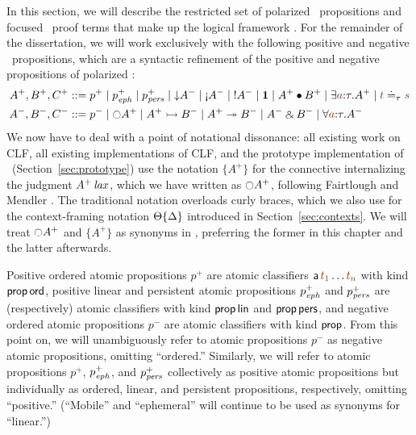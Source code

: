 In this section, we will describe the restricted set of polarized
\ollll~propositions and focused \ollll~proof terms that make up the
logical framework \sls. For the remainder of the dissertation, we will work
exclusively with the following positive and negative
\sls~propositions, which are a syntactic refinement of the positive
and negative propositions of polarized \ollll:
\begin{align*}
A^+, B^+, C^+ & ::= p^+ \mid p^+_\meph \mid p^+_\mpers \mid {\downarrow}A^-
  \mid {\gnab}A^- \mid {!}A^- \mid \one \mid A^+ \fuse B^+
  \mid \exists \lf{a}{:}\tau.A^+ \mid \lf{t} \doteq_\tau \lf{s}
\\
A^-, B^-, C^- & ::= p^- \mid {\ocircle}A^+ \mid A^+ \lefti B^- 
  \mid A^+ \righti B^- \mid A^- \with B^-
  \mid \forall \lf{a}{:}\tau.A^-
\end{align*}
We now have to deal with a point of notational dissonance: all
existing work on CLF, all existing implementations of CLF, and the
prototype implementation of \sls~(Section~\ref{sec:prototype}) use the
notation $\{ A^+ \}$ for the connective internalizing the judgment
${A^+}\,{{\it lax}}$, which we have written as ${\ocircle}A^+$, following
Fairtlough and Mendler \cite{fairtlough97propositional}. The
traditional notation overloads curly braces, which we also use for
the context-framing notation 
${\Theta}\{{\Delta}\}$ introduced in Section~\ref{sec:contexts}. We
will treat ${\ocircle}A^+$ and $\{ A^+ \}$ as synonyms in \sls, preferring the
former in this chapter and the latter afterwards.

Positive ordered atomic propositions $p^+$ are atomic classifiers
${\sf a}\,\lf{t_1}\ldots\lf{t_n}$ with kind ${\sf prop}\,{\sf ord}$,
positive linear and persistent atomic propositions $p^+_{\it eph}$ and
$p^+_{\it pers}$ are (respectively) atomic classifiers with kind ${\sf
  prop}\,{\sf lin}$ and ${\sf prop}\,{\sf pers}$, and negative ordered
atomic propositions $p^-$ are atomic classifiers with kind ${\sf
  prop}$.  From this point on, we will unambiguously refer to atomic
propositions $p^-$ as negative atomic propositions, omitting
``ordered.'' Similarly, we will refer to atomic propositions $p^+$,
$p^+_{\it eph}$, and $p^+_{\it pers}$ collectively as positive atomic
propositions but individually as ordered, linear, and persistent
propositions, respectively, omitting ``positive.''  (``Mobile'' and
``ephemeral'' will continue to be used as synonyms for ``linear.'')

